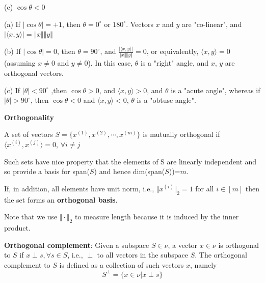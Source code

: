 \begin{marginfigure}
	\centering
	\resizebox{7.5cm}{3cm}{}
	\caption{(c) $\cos\theta<0$}
	\label{}
\end{marginfigure}

(a) If $\vert\cos\theta\vert = +1$, then $\theta=0^{\circ}$ or $180^{\circ}$. Vectors $x$ and $y$ are "co-linear", and $\vert\langle x,y\rangle\vert=\Vert x\Vert \Vert y\Vert$


(b) If $\vert\cos\theta\vert = 0$, then $\theta = 90^{\circ}$, and $\frac{\vert\langle x,y\rangle\vert}{\Vert x\Vert \Vert y\Vert}=0$, or equivalently, $\langle x,y\rangle=0$ (assuming $x\neq 0$ and $y\neq 0$). In this case, $\theta$ is a "right" angle, and $x$, $y$ are orthogonal vectors.

(c) If $\vert \theta\vert <90^{\circ}$ ,then $\cos\theta >0$, and $\langle x,y\rangle >0$, and $\theta$ is a "acute angle", whereas if $\vert \theta\vert >90^{\circ}$, then $\cos\theta <0$ and $\langle x,y\rangle <0$, $\theta$ is a "obtuse angle".



\vspace{0.5cm}
\noindent\textbf{Orthogonality}

A set of vectors $S=\{x^{(1)}, x^{(2)},\cdots, x^{(m)}\}$ is mutually orthogonal if $\langle x^{(i)},x^{(j)}\rangle =0$, $\forall i\neq j$
					
Such sets have nice property that the elements of S are linearly independent and so provide a basis for span($S$) and hence dim(span($S$))=$m$.

If, in addition, all elements have unit norm, i.e., $\Vert x^{(i)}\Vert_{2}=1$ for all $i\in[m]$ then the set forms an \textbf{orthogonal basis}.

Note that we use $\Vert\cdot\Vert_{2}$ to measure length because it is induced by the inner product.




\vspace{0.3cm}
\textbf{Orthogonal complement}: Given a subspace $S\in \nu$, a vector $x\in\nu$ is orthogonal to $S$ if $x\perp s, \forall s\in S$, i.e., $\perp$ to all vectors in the subspace $S$. The orthogonal complement to $S$ is defined as a collection of such vectors $x$, namely
$$ S^{\perp} =\{x\in\nu|x\perp s\}$$

